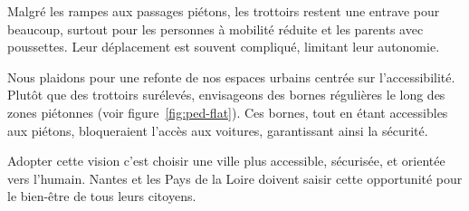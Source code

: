 Malgré les rampes aux passages piétons, les trottoirs restent une
entrave pour beaucoup, surtout pour les personnes à mobilité réduite
et les parents avec poussettes. Leur déplacement est souvent
compliqué, limitant leur autonomie.

Nous plaidons pour une refonte de nos espaces urbains centrée sur
l’accessibilité. Plutôt que des trottoirs surélevés, envisageons des
bornes régulières le long des zones piétonnes (voir
figure~\ref{fig:ped-flat}). Ces bornes, tout en étant accessibles aux
piétons, bloqueraient l'accès aux voitures, garantissant ainsi la
sécurité.

Adopter cette vision c'est choisir une ville plus accessible,
sécurisée, et orientée vers l'humain. Nantes et les Pays de la Loire
doivent saisir cette opportunité pour le bien-être de tous leurs
citoyens.

